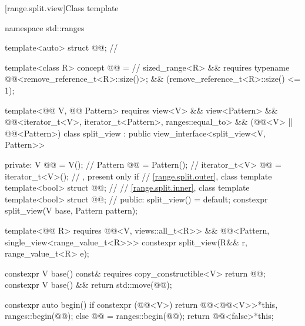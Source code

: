 [range.split.view]{Class template }

%
%
%
%
\begin{codeblock}
namespace std::ranges {
  template<auto> struct @@;       // \expos

  template<class R>
  concept @@ =                          // \expos
    sized_range<R> &&
    requires { typename @@<remove_reference_t<R>::size()>; } &&
    (remove_reference_t<R>::size() <= 1);

  template<@@ V, @@ Pattern>
    requires view<V> && view<Pattern> &&
             @@<iterator_t<V>, iterator_t<Pattern>, ranges::equal_to> &&
             (@@<V> || @@<Pattern>)
  class split_view : public view_interface<split_view<V, Pattern>> {
  private:
    V @@ = V();                              // \expos
    Pattern @@ = Pattern();               // \expos
    iterator_t<V> @@ = iterator_t<V>();   // \expos, present only if 
    // \ref{range.split.outer}, class template 
    template<bool> struct @@;       // \expos
    // \ref{range.split.inner}, class template 
    template<bool> struct @@;       // \expos
  public:
    split_view() = default;
    constexpr split_view(V base, Pattern pattern);

    template<@@ R>
      requires @@<V, views::all_t<R>> &&
               @@<Pattern, single_view<range_value_t<R>>>
    constexpr split_view(R&& r, range_value_t<R> e);

    constexpr V base() const& requires copy_constructible<V> { return @@; }
    constexpr V base() && { return std::move(@@); }

    constexpr auto begin() {
      if constexpr (@@<V>)
        return @@<@@<V>>{*this, ranges::begin(@@)};
      else {
        @@ = ranges::begin(@@);
        return @@<false>{*this};
      }
    }

}}
\end{codeblock}
